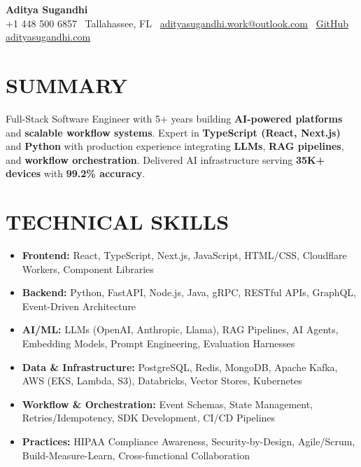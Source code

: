 \documentclass[letterpaper,10pt]{article}
\newcommand{\resumeItem}[1]{\item\small #1}
\begin{document}
\begin{center}
{\huge\textbf{Aditya Sugandhi}} \\
+1 448 500 6857 \textbar\ \textcolor{metablue}{Tallahassee, FL} \textbar\
\href{mailto:adityasugandhi.work@outlook.com}{adityasugandhi.work@outlook.com} \textbar\
\href{https://github.com/adityasugandhi}{GitHub}
\textbar \href{https://adityasugandhi.com}{adityasugandhi.com}
\end{center}
\vspace{-12pt}

\section{\textcolor{metablue}{SUMMARY}}
\small
\vspace{-6pt}
Full-Stack Software Engineer with 5+ years building \textbf{AI-powered platforms} and \textbf{scalable workflow systems}. Expert in \textbf{TypeScript (React, Next.js)} and \textbf{Python} with production experience integrating \textbf{LLMs}, \textbf{RAG pipelines}, and \textbf{workflow orchestration}. Delivered AI infrastructure serving \textbf{35K+ devices} with \textbf{99.2\% accuracy}.

\vspace{-9pt}

\section{\textcolor{metablue}{TECHNICAL SKILLS}}
\vspace{-5pt}
\small
\begin{itemize}
\resumeItem{\textbf{Frontend:} React, TypeScript, Next.js, JavaScript, HTML/CSS, Cloudflare Workers, Component Libraries}
\resumeItem{\textbf{Backend:} Python, FastAPI, Node.js, Java, gRPC, RESTful APIs, GraphQL, Event-Driven Architecture}
\resumeItem{\textbf{AI/ML:} LLMs (OpenAI, Anthropic, Llama), RAG Pipelines, AI Agents, Embedding Models, Prompt Engineering, Evaluation Harnesses}
\resumeItem{\textbf{Data \& Infrastructure:} PostgreSQL, Redis, MongoDB, Apache Kafka, AWS (EKS, Lambda, S3), Databricks, Vector Stores, Kubernetes}
\resumeItem{\textbf{Workflow \& Orchestration:} Event Schemas, State Management, Retries/Idempotency, SDK Development, CI/CD Pipelines}
\resumeItem{\textbf{Practices:} HIPAA Compliance Awareness, Security-by-Design, Agile/Scrum, Build-Measure-Learn, Cross-functional Collaboration}
\end{itemize}
\vspace{-10pt}
\end{document}
